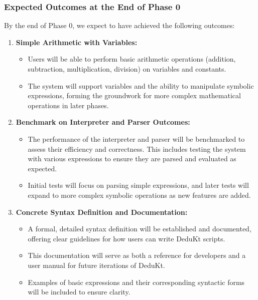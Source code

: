 \subsubsection{Expected Outcomes at the End of Phase 0}
By the end of Phase 0, we expect to have achieved the following outcomes:
\begin{enumerate}
    \item \textbf{Simple Arithmetic with Variables:}
    \begin{itemize}
        \item Users will be able to perform basic arithmetic operations (addition, subtraction, multiplication, division) on variables and constants.
        \item The system will support variables and the ability to manipulate symbolic expressions, forming the groundwork for more complex mathematical operations in later phases.
    \end{itemize}

    \item \textbf{Benchmark on Interpreter and Parser Outcomes:}
    \begin{itemize}
        \item The performance of the interpreter and parser will be benchmarked to assess their efficiency and correctness.
This includes testing the system with various expressions to ensure they are parsed and evaluated as expected.
        \item Initial tests will focus on parsing simple expressions, and later tests will expand to more complex symbolic operations as new features are added.
    \end{itemize}

    \item \textbf{Concrete Syntax Definition and Documentation:}
    \begin{itemize}
        \item A formal, detailed syntax definition will be established and documented, offering clear guidelines for how users can write DeduKt scripts.
        \item This documentation will serve as both a reference for developers and a user manual for future iterations of DeduKt.
        \item Examples of basic expressions and their corresponding syntactic forms will be included to ensure clarity.
    \end{itemize}
\end{enumerate}

